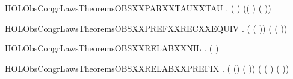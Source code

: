 \newcommand{\HOLObsCongrLawsTheoremsOBSXXPARXXTAUXXPREF}{\UseVerbatim{HOLObsCongrLawsTheoremsOBSXXPARXXTAUXXPREF}}
\begin{SaveVerbatim}{HOLObsCongrLawsTheoremsOBSXXPARXXTAUXXTAU}
\HOLTokenTurnstile{} \HOLSymConst{\HOLTokenForall{}} .
        (\HOLConst{\ensuremath{\tau}} \HOLSymConst{\ensuremath{\parallel}} \HOLConst{\ensuremath{\tau}})
         (\HOLConst{\ensuremath{\tau}}( \HOLSymConst{\ensuremath{\parallel}} \HOLConst{\ensuremath{\tau}}) \HOLSymConst{\ensuremath{+}} \HOLConst{\ensuremath{\tau}}(\HOLConst{\ensuremath{\tau}} \HOLSymConst{\ensuremath{\parallel}} ))
\end{SaveVerbatim}
\newcommand{\HOLObsCongrLawsTheoremsOBSXXPARXXTAUXXTAU}{\UseVerbatim{HOLObsCongrLawsTheoremsOBSXXPARXXTAUXXTAU}}
\begin{SaveVerbatim}{HOLObsCongrLawsTheoremsOBSXXPREFXXRECXXEQUIV}
\HOLTokenTurnstile{} \HOLSymConst{\HOLTokenForall{}}  .
        (  ( )) (  ( ))
\end{SaveVerbatim}
\newcommand{\HOLObsCongrLawsTheoremsOBSXXPREFXXRECXXEQUIV}{\UseVerbatim{HOLObsCongrLawsTheoremsOBSXXPREFXXRECXXEQUIV}}
\begin{SaveVerbatim}{HOLObsCongrLawsTheoremsOBSXXRELABXXNIL}
\HOLTokenTurnstile{} \HOLSymConst{\HOLTokenForall{}}.  (  ) 
\end{SaveVerbatim}
\newcommand{\HOLObsCongrLawsTheoremsOBSXXRELABXXNIL}{\UseVerbatim{HOLObsCongrLawsTheoremsOBSXXRELABXXNIL}}
\begin{SaveVerbatim}{HOLObsCongrLawsTheoremsOBSXXRELABXXPREFIX}
\HOLTokenTurnstile{} \HOLSymConst{\HOLTokenForall{}}  .
        ( () ( ))
         ( ( )   ( ))
\end{SaveVerbatim}
